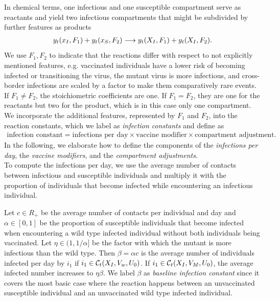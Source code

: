 In chemical terms, one infectious and one susceptible compartment serve as reactants and yield two infectious compartments that might be subdivided by further features as products
\begin{align}
\label{eq:general_infection}
y_t(x_I, F_1) + y_t(x_S, F_2) \longrightarrow y_t(X_I, F_1) + y_t(X_I, F_2).
\end{align}
We use $F_1, F_2$ to indicate that the reactions differ with respect to not explicitly mentioned features, e.g. vaccinated individuals have a lower risk of becoming infected or transitioning the virus, the mutant virus is more infectious, and cross-border infections are scaled by a factor to make them comparatively rare events. If $F_1 \neq F_2$, the stoichiometric coefficients are one. If $F_1=F_2$, they are one for the reactants but two for the product, which is in this case only one compartment. We incorporate the additional features, represented by $F_1$ and $F_2$, into the reaction constants, which we label as \textit{infection constants} and define as
\begin{align*}
\text{infection constant} = \text{infections per day} \times \text{vaccine modifier} \times \text{compartment adjustment}.
\end{align*}
In the following, we elaborate how to define the components of the \textit{infections per day}, the \textit{vaccine modifiers}, and the \textit{compartment adjustments}.\\

To compute the infections per day, we use the average number of contacts between infectious and susceptible individuals and multiply it with the proportion of individuals that become infected while encountering an infectious individual.

Let $c \in R_+$ be the average number of contacts per individual and day and $\alpha \in [0,1]$ be the proportion of susceptible individuals that become infected when encountering a wild type infected individual without both individuals being vaccinated. Let $\eta \in (1, 1/\alpha]$ be the factor with which the mutant is more infectious than the wild type. Then $\beta = \alpha c$ is the average number of individuals infected per day by $i_1$ if $i_1 \in \mathcal{C}_t(X_I, V_w, U_0)$. If $i_1 \in \mathcal{C}_t(X_I, V_M, U_0)$, the average infected number increases to $\eta \beta$. We label $\beta$ as \textit{baseline infection constant} since it covers the most basic case where the reaction happens between an unvaccinated susceptible individual and an unvaccinated wild type infected individual. \\

